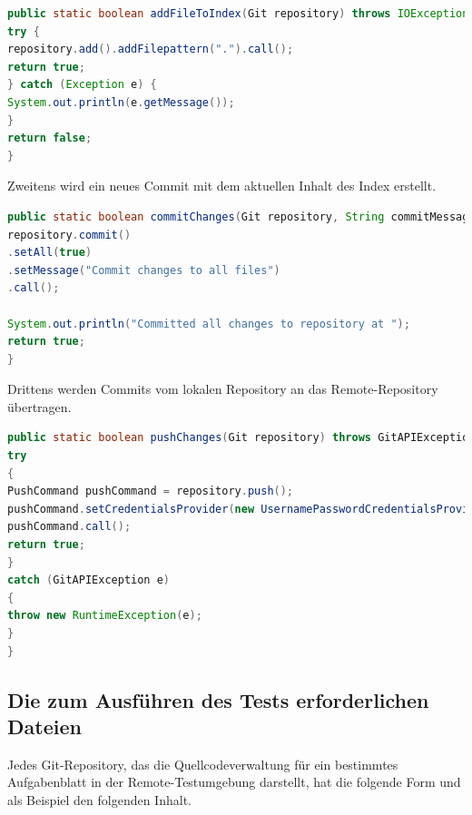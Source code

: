 \documentclass[a4paper,12pt,oneside]{book}
\begin{document}
\begin{lstlisting}[language=JAVA,caption=Add File To Index ]
public static boolean addFileToIndex(Git repository) throws IOException, GitAPIException {
try {
repository.add().addFilepattern(".").call();
return true;
} catch (Exception e) {
System.out.println(e.getMessage());
}
return false;
}
\end{lstlisting} 
Zweitens wird ein neues Commit mit dem aktuellen Inhalt des Index erstellt.
\begin{lstlisting}[language=JAVA,caption=commit Changes ]
	public static boolean commitChanges(Git repository, String commitMessage) throws GitAPIException, IOException {
repository.commit()
.setAll(true)
.setMessage("Commit changes to all files")
.call();

System.out.println("Committed all changes to repository at ");
return true;
}
\end{lstlisting} 
\newpage
Drittens werden Commits vom lokalen Repository an das Remote-Repository übertragen.
\begin{lstlisting}[language=JAVA,caption=Push Changes ]
public static boolean pushChanges(Git repository) throws GitAPIException, URISyntaxException, IOException {
try
{
PushCommand pushCommand = repository.push();
pushCommand.setCredentialsProvider(new UsernamePasswordCredentialsProvider("swissi", "Mh123456"));
pushCommand.call();
return true;
}
catch (GitAPIException e)
{
throw new RuntimeException(e);
}
}
\end{lstlisting} 

 
\subsection{Die zum Ausführen des Tests erforderlichen Dateien}
Jedes Git-Repository, das die Quellcodeverwaltung für ein bestimmtes Aufgabenblatt in der Remote-Testumgebung darstellt, hat die folgende Form und als Beispiel den folgenden Inhalt.
\newline
{}
\end{document}

